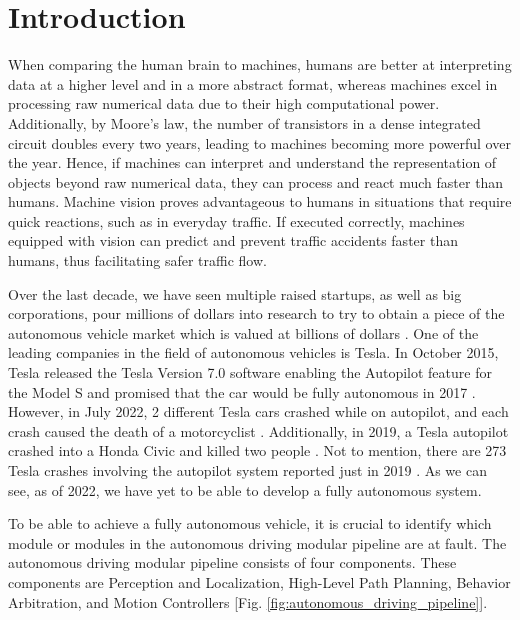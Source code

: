 \chapter{Introduction} \label{sec:introduction}

When comparing the human brain to machines, humans are better at interpreting data at a higher level and in a more abstract format, whereas machines excel in processing raw numerical data due to their high computational power. Additionally, by Moore's law, the number of transistors in a dense integrated circuit doubles every two years, leading to machines becoming more powerful over the year. Hence, if machines can interpret and understand the representation of objects beyond raw numerical data, they can process and react much faster than humans. Machine vision proves advantageous to humans in situations that require quick reactions, such as in everyday traffic. If executed correctly, machines equipped with vision can predict and prevent traffic accidents faster than humans, thus facilitating safer traffic flow.

Over the last decade, we have seen multiple raised startups, as well as big corporations, pour millions of dollars into research to try to obtain a piece of the autonomous vehicle market which is valued at billions of dollars \cite{autonomous_vehicle_market}. One of the leading companies in the field of autonomous vehicles is Tesla. In October 2015, Tesla released the Tesla Version 7.0 software enabling the Autopilot feature for the Model S and promised that the car would be fully autonomous in 2017 \cite{tesla_software_v7, tesla_2017_promise}. However, in July 2022, 2 different Tesla cars crashed while on autopilot, and each crash caused the death of a motorcyclist \cite{tesla_crash2}. Additionally, in 2019, a Tesla autopilot crashed into a Honda Civic and killed two people \cite{tesla_crash1}. Not to mention, there are 273 Tesla crashes involving the autopilot system reported just in 2019 \cite{autonomous_vehicle_market}. As we can see, as of 2022, we have yet to be able to develop a fully autonomous system.

To be able to achieve a fully autonomous vehicle, it is crucial to identify which module or modules in the autonomous driving modular pipeline are at fault. The autonomous driving modular pipeline consists of four components. These components are Perception and Localization, High-Level Path Planning, Behavior Arbitration, and Motion Controllers [Fig. \ref{fig:autonomous_driving_pipeline}].

